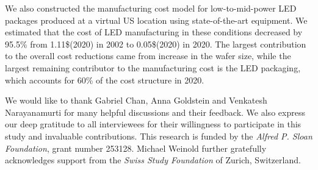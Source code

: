 \documentclass[a4paper,nocompress]{spie}  %
\begin{document}
    We also constructed the manufacturing cost model for low-to-mid-power LED packages produced at a virtual US location using state-of-the-art equipment. We estimated that the cost of LED manufacturing in these conditions decreased by 95.5\% from 1.11\$(2020) in 2002 to 0.05\$(2020) in 2020. The largest contribution to the overall cost reductions came from increase in the wafer size, while the largest remaining contributor to the manufacturing cost is the LED packaging, which accounts for 60\% of the cost structure in 2020.

\acknowledgments %

We would like to thank Gabriel Chan, Anna Goldstein and Venkatesh Narayanamurti for many helpful discussions and their feedback. We also express our deep gratitude to all interviewees for their willingness to participate in this study and invaluable contributions. This research is funded by the \textit{Alfred P. Sloan Foundation}, grant number 253128. Michael Weinold further gratefully acknowledges support from the \textit{Swiss Study Foundation} of Zurich, Switzerland.

\clearpage
\end{document}
